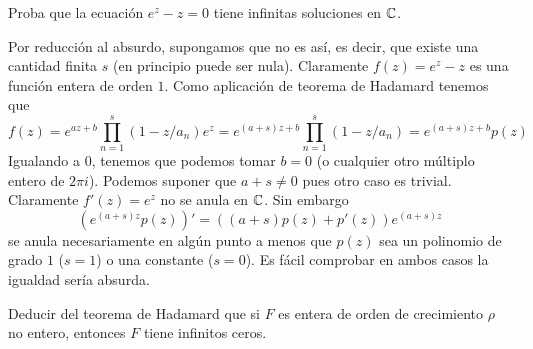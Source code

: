 \documentclass[twoside]{article}
\begin{document}
\begin{ejercicio}{6}
Proba que la ecuación $e^{z}-z=0$ tiene infinitas soluciones en $\mathbb{C}$.
\end{ejercicio}
\begin{solucion}
Por reducción al absurdo, supongamos que no es así, es decir, que existe una cantidad finita $s$ (en principio puede ser nula). Claramente $f(z)=e^z-z$ es una función entera de orden $1$. Como aplicación de teorema de Hadamard tenemos que
$$
f(z)=e^{az+b}\prod_{n=1}^s (1-z/a_n)e^z = e^{(a+s)z+b}\prod_{n=1}^s(1-z/a_n) = e^{(a+s)z+b}p(z)
$$
Igualando a $0$, tenemos que podemos tomar $b=0$ (o cualquier otro múltiplo entero de $2\pi i$). Podemos suponer que $a+s\neq 0$ pues otro caso es trivial. Claramente $f'(z)=e^z$ no se anula en $\mathbb{C}$. Sin embargo
$$
(e^{(a+s)z}p(z))' = ((a+s)p(z)+p'(z))e^{(a+s)z}
$$
se anula necesariamente en algún punto a menos que $p(z)$ sea un polinomio de grado $1$ ($s=1$) o una constante ($s=0$). Es fácil comprobar en ambos casos la igualdad sería absurda.
\end{solucion}
\newpage
\begin{ejercicio}{7}
Deducir del teorema de Hadamard que si $F$ es entera de orden de crecimiento $\rho$ no entero, entonces $F$ tiene infinitos ceros.
\end{ejercicio}
\end{document}
